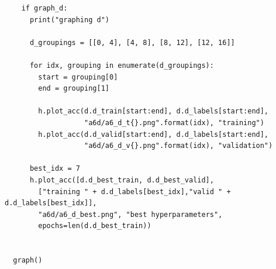 \documentclass{article}
\newcommand{\1}{\mathbf{1}}
\begin{document}
{\begin{verbatim}
    if graph_d:
      print("graphing d")
  
      d_groupings = [[0, 4], [4, 8], [8, 12], [12, 16]]
  
      for idx, grouping in enumerate(d_groupings):
        start = grouping[0]
        end = grouping[1]
  
        h.plot_acc(d.d_train[start:end], d.d_labels[start:end],
                   "a6d/a6_d_t{}.png".format(idx), "training")
        h.plot_acc(d.d_valid[start:end], d.d_labels[start:end],
                   "a6d/a6_d_v{}.png".format(idx), "validation")
  
      best_idx = 7
      h.plot_acc([d.d_best_train, d.d_best_valid],
        ["training " + d.d_labels[best_idx],"valid " + d.d_labels[best_idx]],
        "a6d/a6_d_best.png", "best hyperparameters",
        epochs=len(d.d_best_train))
  
  
  graph()
    
\end{verbatim}

}
\end{document}
